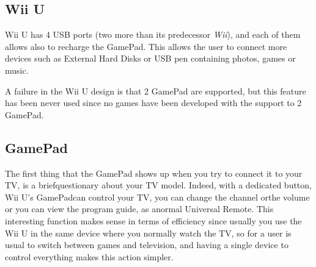 \documentclass[11pt,a4paper,titlepage]{article}
\begin{document}
		\subsection{Wii U}
			Wii U has 4 USB ports (two more than its predecessor \textit{Wii}), and each of them allows also to recharge the GamePad. This allows the user to connect more devices such as External Hard Disks or USB pen containing photos, games or music.

			A failure in the Wii U design is that 2 GamePad are supported, but this feature has been never used since no games have been developed with the support to 2 GamePad.
		\subsection{GamePad}
			The first thing that the GamePad shows up when you try to connect it to your TV, is a briefquestionary about your TV model.
			Indeed, with a dedicated button, Wii U's GamePadcan control your TV, you can change the channel orthe volume or you can view the program guide, as anormal Universal Remote.
			This interesting function makes sense in terms of efficiency since usually you use the Wii U in the same device where you normally watch the TV, so for a user is usual to switch between games and television, and having a single device to control everything makes this action simpler.
\end{document}
